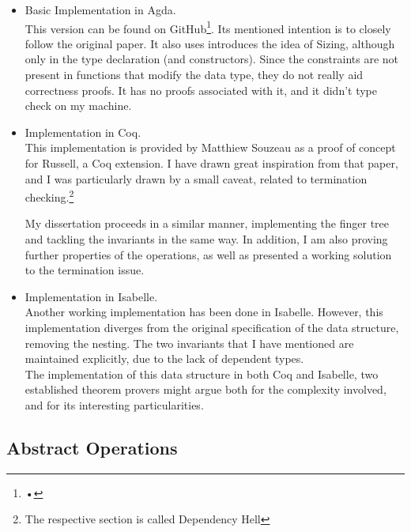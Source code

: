 \documentclass[12pt,twoside,notitlepage]{report}
\begin{document}
\begin{itemize}
\item Basic Implementation in Agda. \\
This version can be found on GitHub\footnote{•}. Its mentioned intention is to closely follow the original paper. It also uses introduces the idea of Sizing, although only in the type declaration (and constructors). Since the constraints are not present in functions that modify the data type, they do not really aid correctness proofs. It has no proofs associated with it, and it didn't type check on my machine.
\item Implementation in Coq. \\
This implementation is provided by Matthiew Souzeau\cite{coq} as a proof of concept for Russell, a Coq extension. I have drawn great inspiration from that paper, and I was particularly drawn by a small caveat, related to termination checking.\footnote{The respective section is called Dependency Hell} 

My dissertation proceeds in a similar manner, implementing the finger tree and tackling the invariants in the same way. In addition, I am also proving further properties of the operations, as well as presented a working solution to the termination issue.

\item Implementation in Isabelle. \\
Another working implementation has been done in Isabelle. However, this implementation diverges from the original specification of the data structure, removing the nesting. The two invariants that I have mentioned are maintained explicitly, due to the lack of dependent types.\\ 

The implementation of this data structure in both Coq and Isabelle, two established theorem provers might argue both for the complexity involved, and for its interesting particularities.
\end{itemize}

\subsection{Abstract Operations}
\end{document}
